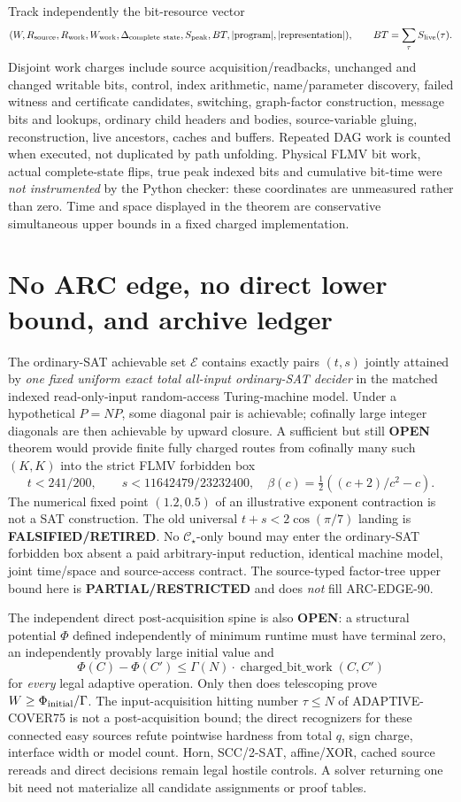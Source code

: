 \documentclass[11pt]{article}
\newcommand{\CS}{\mathcal C_{\star}}
\begin{document}
Track independently the bit-resource vector
\[
 (W,R_{\rm source},R_{\rm work},W_{\rm work},
 \Delta_{\rm complete\ state},S_{\rm peak},
 BT,|{\rm program}|,|{\rm representation}|),\qquad
 BT=\sum_\tau S_{\rm live}(\tau).
\]
Disjoint work charges include source acquisition/readbacks, unchanged and changed writable bits, control, index arithmetic, name/parameter discovery, failed witness and certificate candidates, switching, graph-factor construction, message bits and lookups, ordinary child headers and bodies, source-variable gluing, reconstruction, live ancestors, caches and buffers. Repeated DAG work is counted when executed, not duplicated by path unfolding. Physical FLMV bit work, actual complete-state flips, true peak indexed bits and cumulative bit-time were \emph{not instrumented} by the Python checker: these coordinates are unmeasured rather than zero. Time and space displayed in the theorem are conservative simultaneous upper bounds in a fixed charged implementation.

\section{No ARC edge, no direct lower bound, and archive ledger}
The ordinary-SAT achievable set \(\mathcal E\) contains exactly pairs \((t,s)\) jointly attained by \emph{one fixed uniform exact total all-input ordinary-SAT decider} in the matched indexed read-only-input random-access Turing-machine model. Under a hypothetical \(P=NP\), some diagonal pair is achievable; cofinally large integer diagonals are then achievable by upward closure. A sufficient but still \textbf{OPEN} theorem would provide finite fully charged routes from cofinally many such \((K,K)\) into the strict FLMV forbidden box
\[
 t<241/200,\qquad s<11642479/23232400,\quad
 \beta(c)=\tfrac12((c+2)/c^2-c).
\]
The numerical fixed point \((1.2,0.5)\) of an illustrative exponent contraction is not a SAT construction. The old universal \(t+s<2\cos(\pi/7)\) landing is \textbf{FALSIFIED/RETIRED}. No \(\CS\)-only bound may enter the ordinary-SAT forbidden box absent a paid arbitrary-input reduction, identical machine model, joint time/space and source-access contract. The source-typed factor-tree upper bound here is \textbf{PARTIAL/RESTRICTED} and does \emph{not} fill ARC-EDGE-90.

The independent direct post-acquisition spine is also \textbf{OPEN}: a structural potential \(\Phi\) defined independently of minimum runtime must have terminal zero, an independently provably large initial value and
\[
 \Phi(C)-\Phi(C')\le\Gamma(N)\cdot
 \operatorname{charged\_bit\_work}(C,C')
\]
for \emph{every} legal adaptive operation. Only then does telescoping prove \(W\ge\Phi_{\rm initial}/\Gamma\). The input-acquisition hitting number \(\tau\le N\) of ADAPTIVE-COVER75 is not a post-acquisition bound; the direct recognizers for these connected easy sources refute pointwise hardness from total \(q\), sign charge, interface width or model count. Horn, SCC/2-SAT, affine/XOR, cached source rereads and direct decisions remain legal hostile controls. A solver returning one bit need not materialize all candidate assignments or proof tables.
\end{document}
